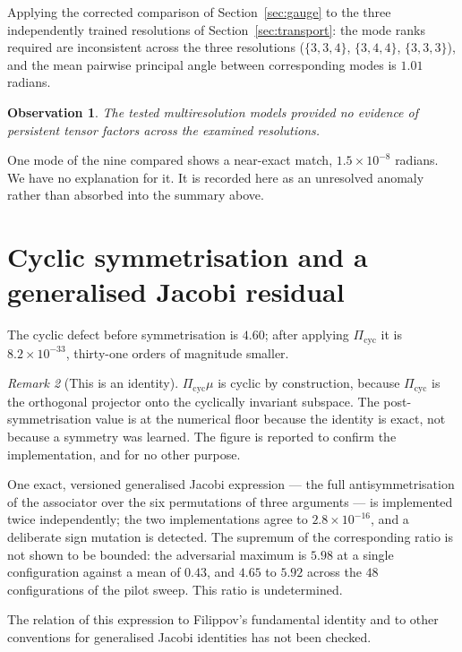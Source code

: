 \documentclass[11pt]{amsart}
\newtheorem{observation}{Observation}[section]
\theoremstyle{remark}
\newtheorem{remark}[observation]{Remark}
\begin{document}
Applying the corrected comparison of Section~\ref{sec:gauge} to the three independently
trained resolutions of Section~\ref{sec:transport}: the mode ranks required are inconsistent
across the three resolutions ($\{3,3,4\}$, $\{3,4,4\}$, $\{3,3,3\}$), and the mean pairwise
principal angle between corresponding modes is $1.01$ radians.

\begin{observation}
\label{obs:persistence}
The tested multiresolution models provided no evidence of persistent tensor factors across
the examined resolutions.
\end{observation}

One mode of the nine compared shows a near-exact match, $1.5\times10^{-8}$ radians. We have
no explanation for it. It is recorded here as an unresolved anomaly rather than absorbed
into the summary above.

\section{Cyclic symmetrisation and a generalised Jacobi residual}
\label{sec:cyclic}

The cyclic defect before symmetrisation is $4.60$; after applying $\Pi_{\mathrm{cyc}}$ it is
$8.2\times10^{-33}$, thirty-one orders of magnitude smaller.

\begin{remark}[This is an identity]
\label{rem:cyclicidentity}
$\Pi_{\mathrm{cyc}}\mu$ is cyclic by construction, because $\Pi_{\mathrm{cyc}}$ is the
orthogonal projector onto the cyclically invariant subspace. The post-symmetrisation value
is at the numerical floor because the identity is exact, not because a symmetry was learned.
The figure is reported to confirm the implementation, and for no other purpose.
\end{remark}

One exact, versioned generalised Jacobi expression --- the full antisymmetrisation of the
associator over the six permutations of three arguments --- is implemented twice
independently; the two implementations agree to $2.8\times10^{-16}$, and a deliberate sign
mutation is detected. The supremum of the corresponding ratio is not shown to be bounded:
the adversarial maximum is $5.98$ at a single configuration against a mean of $0.43$, and
$4.65$ to $5.92$ across the $48$ configurations of the pilot sweep. This ratio is
undetermined.

The relation of this expression to Filippov's fundamental identity \cite{Filippov1985} and
to other conventions for generalised Jacobi identities has not been checked.
\end{document}
